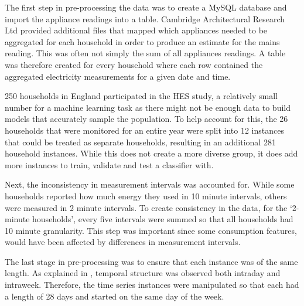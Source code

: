 The first step in pre-processing the data was to create a MySQL database and import the appliance readings into a table. Cambridge Architectural Research Ltd provided additional files that mapped which appliances needed to be aggregated for each household in order to produce an estimate for the mains reading. This was often not simply the sum of all appliances readings. A table was therefore created for every household where each row contained the aggregated electricity measurements for a given date and time. 

250 households in England participated in the HES study, a relatively small number for a machine learning task as there might not be enough data to build models that accurately sample the population. To help account for this, the 26 households that were monitored for an entire year were split into 12 instances that could be treated as separate households, resulting in an additional 281 household instances. While this does not create a more diverse group, it does add more instances to train, validate and test a classifier with.

Next, the inconsistency in measurement intervals was accounted for. While some households reported how much energy they used in 10 minute intervals, others were measured in 2 minute intervals. To create consistency in the data, for the `2-minute households', every five intervals were summed so that all households had 10 minute granularity. This step was important since some consumption features, would have been affected by differences in measurement intervals.

The last stage in pre-processing was to ensure that each instance was of the same length. As explained in \fourierSection, temporal structure was observed both intraday and intraweek. Therefore, the time series instances were manipulated so that each had a length of 28 days and started on the same day of the week.





